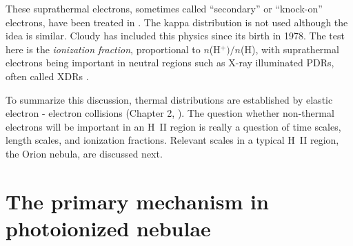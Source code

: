 \documentclass[debug, preprint, twocolumn]{rmaa}
\begin{document}
These suprathermal electrons, sometimes called ``secondary'' or ``knock-on''  electrons,
have been treated in
\citet{1968ApJ...152..971S,1973A&A....25....1B,1979ApJ...234..761S,1991ApJ...375..190X,1985ApJ...298..268S,
1999ApJS..125..237D}.
The  kappa distribution is not used although the idea is similar.
Cloudy has included this physics since its birth in 1978.
The test here is the \emph{ionization fraction}, proportional to $n$(H$^+)/ n$(H),
with suprathermal electrons  being important in neutral regions such as X-ray illuminated PDRs,
often called XDRs \citep{Maloney1996}.

To summarize this discussion, thermal distributions are established by elastic electron - electron collisions
(Chapter 2, \citealp{1978ppim.book.....S}).
The question whether non-thermal electrons will be important in an H~II region is
really a question of time scales, length scales, and ionization fractions.
Relevant scales in a typical H~II region, the Orion nebula, are discussed next.



\section{The primary mechanism in photoionized nebulae}
\label{sec:primary}
\end{document}

